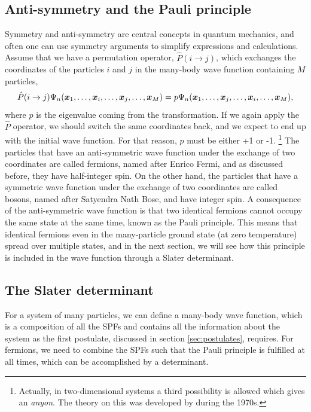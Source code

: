 \subsection{Anti-symmetry and the Pauli principle} \label{sec:symmetry}
Symmetry and anti-symmetry are central concepts in quantum mechanics, and often one can use symmetry arguments to simplify expressions and calculations. Assume that we have a permutation operator, $\hat{P}(i\rightarrow j)$, which exchanges the coordinates of the particles $i$ and $j$ in the many-body wave function containing $M$ particles,
\begin{equation}
\hat{P}(i\rightarrow j)\Psi_n(\boldsymbol{{x}}_1,\hdots,\boldsymbol{{x}}_i,\hdots,\boldsymbol{{x}}_j,\hdots,\boldsymbol{{x}}_M)=p\Psi_n(\boldsymbol{{x}}_1,\hdots,\boldsymbol{{x}}_j,\hdots,\boldsymbol{{x}}_i,\hdots,\boldsymbol{{x}}_M),
\end{equation}
where $p$ is the eigenvalue coming from the transformation. If we again apply the $\hat{P}$ operator, we should switch the same coordinates back, and we expect to end up with the initial wave function. For that reason, $p$ must be either +1 or -1. \footnote{Actually, in two-dimensional systems a third possibility is allowed which gives an \textit{anyon}. The theory on this was developed by \citet{leinaas_one_1977} during the 1970s.} The particles that have an anti-symmetric wave function under the exchange of two coordinates are called fermions, named after Enrico Fermi, and as discussed before, they have half-integer spin. On the other hand, the particles that have a symmetric wave function under the exchange of two coordinates are called bosons, named after Satyendra Nath Bose, and have integer spin. A consequence of the anti-symmetric wave function is that two identical fermions cannot occupy the same state at the same time, known as the Pauli principle. This means that identical fermions even in the many-particle ground state (at zero temperature) spread over multiple states, and in the next section, we will see how this principle is included in the wave function through a Slater determinant. 

\subsection{The Slater determinant} \label{sec:slater}
For a system of many particles, we can define a many-body wave function, which is a composition of all the SPFs and contains all the information about the system as the first postulate, discussed in section \ref{sec:postulates}, requires. For fermions, we need to combine the SPFs such that the Pauli principle is fulfilled at all times, which can be accomplished by a determinant. 

